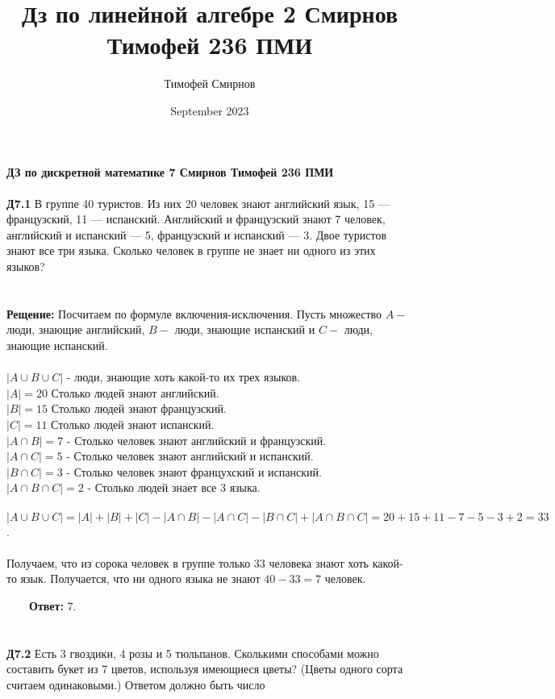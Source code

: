 \documentclass[a4paper, 12pt]{article}
\title{Дз по линейной алгебре 2 Смирнов Тимофей 236 ПМИ}
\author{Тимофей Смирнов}
\date{September 2023}
\begin{document}
    {\center \bf \large ДЗ по дискретной математике 7 Смирнов Тимофей 236 ПМИ}
    \\
    \\ \textbf{Д7.1} В группе 40 туристов. Из них 20 человек знают английский язык, 15 — французский, 11 — испанский. Английский и французский знают 7 человек, английский и испанский — 5, французский и
    испанский — 3. Двое туристов знают все три языка. Сколько человек в группе не знает ни одного из
    этих языков?
    \\
    \\
    \\ \textbf{Рещение: } Посчитаем по формуле включения-исключения. Пусть множество $A  - $ люди, знающие английский, $B - $ люди, знающие испанский и $C -$ люди, знающие испанский.
    \\
    \\ $|A \cup B \cup C|$ - люди, знающие хоть какой-то их трех языков.
    \\ $|A| = 20$ Столько людей знают английский.
    \\ $|B| = 15$ Столько людей знают французский.
    \\ $|C| = 11$ Столько людей знают испанский.
    \\ $|A \cap B| = 7$ - Столько человек знают английский и французский.
    \\ $|A \cap C| = 5$ - Столько человек знают английский и испанский.
    \\ $|B \cap C| = 3$ - Столько человек знают францухский и испанский.
    \\ $|A \cap B \cap C| = 2$ - Столько людей знает все 3 языка.
    \\
    \\ $|A \cup B \cup C| = |A| + |B| + |C| - |A \cap B| - |A \cap C| - |B \cap C| + |A \cap B \cap C| = 20 + 15 + 11 - 7 - 5 - 3 + 2 = 33$.
    \\
    \\ Получаем, что из сорока человек в группе только 33 человека знают хоть какой-то язык. Получается, что ни одного языка не знают $40 - 33 = 7$ человек.
    \\
    \par \ \ \ \ \textbf{Ответ: } 7.
    \\
    \\
    \\ \textbf{Д7.2} Есть 3 гвоздики, 4 розы и 5 тюльпанов. Сколькими способами можно составить букет из 7 цветов,
    используя имеющиеся цветы? (Цветы одного сорта считаем одинаковыми.) Ответом должно быть число
\end{document}

